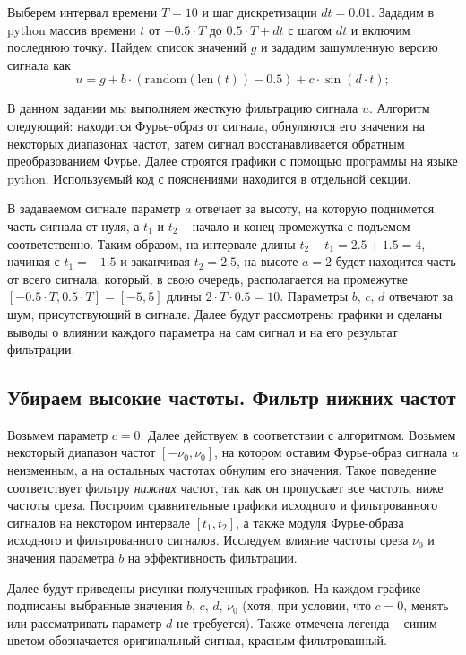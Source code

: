 \documentclass[a4paper, 12pt]{article}
\begin{document}
    Выберем интервал времени $T=10$ и шаг дискретизации $dt=0.01$. Зададим в python массив времени $t$ от $-0.5\cdot T$ до $0.5\cdot T+dt$
    с шагом $dt$ и включим последнюю точку. Найдем список значений $g$ и зададим зашумленную версию сигнала как
    $$
    u=g+b\cdot(\text{random}(\text{len}(t))-0.5) + c\cdot \sin(d\cdot t);
    $$


    В данном задании мы выполняем жесткую фильтрацию сигнала $u$. Алгоритм следующий: находится Фурье-образ от сигнала,
    обнуляются его значения на некоторых диапазонах частот, затем сигнал восстанавливается обратным преобразованием Фурье.
    Далее строятся графики с помощью программы на языке python. Используемый код с пояснениями находится в отдельной секции.


    В задаваемом сигнале параметр $a$ отвечает за высоту, на которую поднимется часть сигнала от нуля, а $t_1 \text{ и } t_2$ -- начало
    и конец промежутка с подъемом соответственно. Таким образом, на интервале длины $t_2-t_1=2.5+1.5=4$, начиная с $t_1=-1.5$ и заканчивая $t_2=2.5$,
    на высоте $a=2$ будет находится часть от всего сигнала, который, в свою очередь, располагается на промежутке $[-0.5\cdot T,0.5\cdot T]=[-5,5]$
    длины $2\cdot T\cdot 0.5=10$. Параметры $b,\,c,\,d$ отвечают за шум, присутствующий в сигнале. Далее будут рассмотрены графики и сделаны выводы о
    влиянии каждого параметра на сам сигнал и на его результат фильтрации.


    \subsection{Убираем высокие частоты. Фильтр нижних частот}
    Возьмем параметр $c=0$. Далее действуем в соответствии с алгоритмом. Возьмем некоторый диапазон частот $[-\nu_0, \nu_0]$, на котором оставим Фурье-образ
    сигнала $u$ неизменным, а на остальных частотах обнулим его значения. Такое поведение соответствует фильтру \textit{нижних} частот, так как он пропускает
    все частоты ниже частоты среза. Построим сравнительные графики исходного и фильтрованного сигналов на некотором интервале $[t_1,t_2]$, а также модуля
    Фурье-образа исходного и фильтрованного сигналов. Исследуем влияние частоты среза $\nu_0$ и значения параметра $b$ на эффективность фильтрации.
    
    
    Далее будут приведены рисунки полученных графиков. На каждом графике подписаны выбранные значения $b,\,c,\,d,\,\nu_0$
    (хотя, при условии, что $c=0$, менять или рассматривать параметр $d$ не требуется). Также отмечена легенда -- синим цветом
    обозначается оригинальный сигнал, красным фильтрованный.
\end{document}
